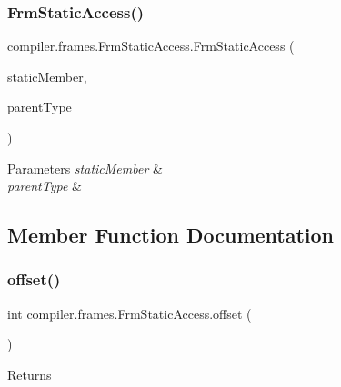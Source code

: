 \subsubsection{\texorpdfstring{Frm\+Static\+Access()}{FrmStaticAccess()}}
{\footnotesize\ttfamily compiler.\+frames.\+Frm\+Static\+Access.\+Frm\+Static\+Access (\begin{DoxyParamCaption}\item[{\hyperlink{classcompiler_1_1abstr_1_1tree_1_1def_1_1_abs_var_def}{Abs\+Var\+Def}}]{static\+Member,  }\item[{\hyperlink{classcompiler_1_1seman_1_1type_1_1_can_type}{Can\+Type}}]{parent\+Type }\end{DoxyParamCaption})}


\begin{DoxyParams}{Parameters}
{\em static\+Member} & \\
\hline
{\em parent\+Type} & \\
\hline
\end{DoxyParams}


\subsection{Member Function Documentation}
\mbox{\label{classcompiler_1_1frames_1_1_frm_static_access_aa25f7d44702e6e0242b7b894d30c7c08}} 
\subsubsection{\texorpdfstring{offset()}{offset()}}
{\footnotesize\ttfamily int compiler.\+frames.\+Frm\+Static\+Access.\+offset (\begin{DoxyParamCaption}{ }\end{DoxyParamCaption})}

\begin{DoxyReturn}{Returns}

\end{DoxyReturn}
\mbox{\label{classcompiler_1_1frames_1_1_frm_static_access_a7e02d2e838ffec8979960f12e4938436}} 

